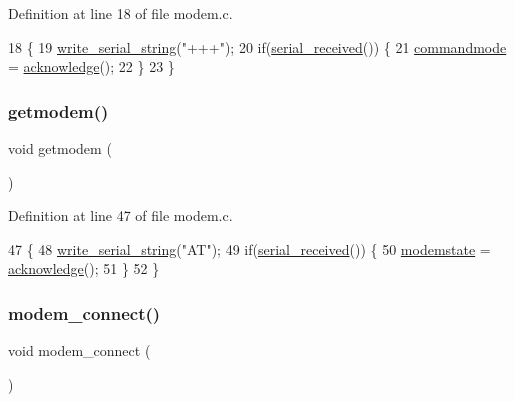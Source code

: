 Definition at line 18 of file modem.\+c.


\begin{DoxyCode}
18                       \{
19     \hyperlink{a00050_aabbe45d6670f606c53ba38a5fb14b650_aabbe45d6670f606c53ba38a5fb14b650}{write\_serial\_string}(\textcolor{stringliteral}{"+++"});
20     \textcolor{keywordflow}{if}(\hyperlink{a00050_af10f0e64ba89e8635aa7245ca08297c5_af10f0e64ba89e8635aa7245ca08297c5}{serial\_received}()) \{
21         \hyperlink{a00038_aaf612f2f6c2c9931ab63296b3514a037_aaf612f2f6c2c9931ab63296b3514a037}{commandmode} = \hyperlink{a00038_a8529dba543149138317e327931bf5a5c_a8529dba543149138317e327931bf5a5c}{acknowledge}();
22     \}
23 \}
\end{DoxyCode}
\mbox{\label{a00038_a5e56e19ccc8f36690d515dd09948db10_a5e56e19ccc8f36690d515dd09948db10}} 
\subsubsection{\texorpdfstring{getmodem()}{getmodem()}}
{\footnotesize\ttfamily void getmodem (\begin{DoxyParamCaption}{ }\end{DoxyParamCaption})}



Definition at line 47 of file modem.\+c.


\begin{DoxyCode}
47                 \{
48     \hyperlink{a00050_aabbe45d6670f606c53ba38a5fb14b650_aabbe45d6670f606c53ba38a5fb14b650}{write\_serial\_string}(\textcolor{stringliteral}{"AT"});
49     \textcolor{keywordflow}{if}(\hyperlink{a00050_af10f0e64ba89e8635aa7245ca08297c5_af10f0e64ba89e8635aa7245ca08297c5}{serial\_received}()) \{
50         \hyperlink{a00038_a0105e5654e7f0fa503f2853c88a2f782_a0105e5654e7f0fa503f2853c88a2f782}{modemstate} = \hyperlink{a00038_a8529dba543149138317e327931bf5a5c_a8529dba543149138317e327931bf5a5c}{acknowledge}();
51     \}
52 \}
\end{DoxyCode}
\mbox{\label{a00038_a283a7e4b715971478687b2d7547780cb_a283a7e4b715971478687b2d7547780cb}} 
\subsubsection{\texorpdfstring{modem\+\_\+connect()}{modem\_connect()}}
{\footnotesize\ttfamily void modem\+\_\+connect (\begin{DoxyParamCaption}{ }\end{DoxyParamCaption})}



